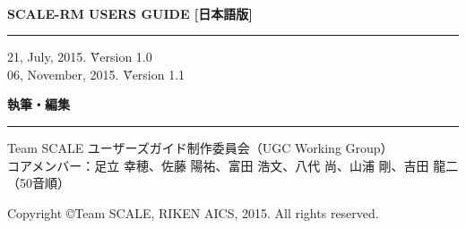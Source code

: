 \newpage
\thispagestyle{empty}

　\\

\vspace{10mm}
{\large{\bf SCALE-RM USERS GUIDE [日本語版]}}\\
\hrule width 90mm
\begin{tabbing} 
21, July, 2015.  \= \=  Version 1.0\\
06, November, 2015.  \= \=  Version 1.1
\end{tabbing} 


\vspace{10mm}
{\large{\bf 執筆・編集}}\\
\hrule width 90mm
\begin{tabbing} 
Team SCALE ユーザーズガイド制作委員会（UGC Working Group）\\
コアメンバー：足立 幸穂、佐藤 陽祐、富田 浩文、八代 尚、山浦 剛、吉田 龍二（50音順）\\
\end{tabbing} 


\vspace{110mm}
\begin{flushright}

\vspace{10mm}
Copyright \copyright Team SCALE, RIKEN AICS, 2015. All rights reserved.
\end{flushright}

